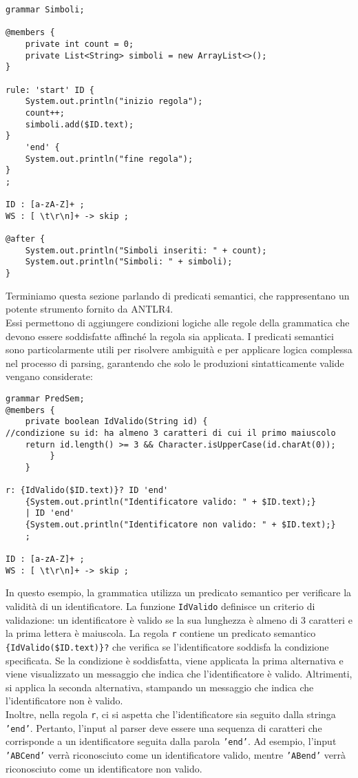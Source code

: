 \documentclass{article}
\begin{document}
\begin{lstlisting}
grammar Simboli;

@members {
    private int count = 0;
    private List<String> simboli = new ArrayList<>();
}

rule: 'start' ID {
    System.out.println("inizio regola");
    count++;
    simboli.add($ID.text);
}
    'end' {
    System.out.println("fine regola");
}
;

ID : [a-zA-Z]+ ;
WS : [ \t\r\n]+ -> skip ;

@after {
    System.out.println("Simboli inseriti: " + count);
    System.out.println("Simboli: " + simboli);
}
\end{lstlisting}
\noindent
Terminiamo questa sezione parlando di predicati semantici, che rappresentano un potente strumento fornito da ANTLR4. \\
\noindent
Essi permettono di aggiungere condizioni logiche alle regole della grammatica che devono essere soddisfatte affinché la regola sia applicata. I predicati semantici sono particolarmente utili per risolvere ambiguità e per applicare logica complessa nel processo di parsing, garantendo che solo le produzioni sintatticamente valide vengano considerate:

\begin{lstlisting}
grammar PredSem;
@members {
    private boolean IdValido(String id) {
//condizione su id: ha almeno 3 caratteri di cui il primo maiuscolo
    return id.length() >= 3 && Character.isUpperCase(id.charAt(0));
         }
    }

r: {IdValido($ID.text)}? ID 'end' 
    {System.out.println("Identificatore valido: " + $ID.text);}
    | ID 'end' 
    {System.out.println("Identificatore non valido: " + $ID.text);}
    ;

ID : [a-zA-Z]+ ;
WS : [ \t\r\n]+ -> skip ;
\end{lstlisting}

\noindent
In questo esempio, la grammatica utilizza un predicato semantico per verificare la validità di un identificatore. La funzione \texttt{IdValido} definisce un criterio di validazione: un identificatore è valido se la sua lunghezza è almeno di 3 caratteri e la prima lettera è maiuscola. La regola \texttt{r} contiene un predicato semantico \texttt{\{IdValido(\$ID.text)\}?} che verifica se l'identificatore soddisfa la condizione specificata. Se la condizione è soddisfatta, viene applicata la prima alternativa e viene visualizzato un messaggio che indica che l'identificatore è valido. Altrimenti, si applica la seconda alternativa, stampando un messaggio che indica che l'identificatore non è valido.\\
\noindent
Inoltre, nella regola \texttt{r}, ci si aspetta che l'identificatore sia seguito dalla stringa \texttt{'end'}. Pertanto, l'input al parser deve essere una sequenza di caratteri che corrisponde a un identificatore seguita dalla parola \texttt{'end'}. Ad esempio, l'input \texttt{'ABCend'} verrà riconosciuto come un identificatore valido, mentre \texttt{'ABend'} verrà riconosciuto come un identificatore non valido.
\end{document}
